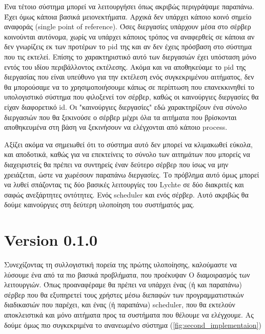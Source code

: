 Ένα τέτοιο σύστημα μπορεί να λειτουργήσει όπως ακριβώς περιγράψαμε παραπάνω. Έχει όμως κάποια βασικά μειονεκτήματα.
Αρχικά δεν υπάρχει κάποιο κοινό σημείο αναφοράς (single point of reference). Όσες διεργασίες υπάρχουν μέσα στο σέρβερ κοινούνται αυτόνομα,
χωρίς να υπάρχει κάποιος τρόπος να αναφερθείς σε κάποια αν δεν γνωρίζεις εκ των προτέρων το pid της και αν δεν έχεις πρόσβαση
στο σύστημα που τις εκτελεί. Επίσης το χαρακτηριστικό αυτό των διεργασιών έχει υπόσταση μόνο εντός του ιδίου περιβάλλοντος εκτέλεσης. Ακόμα και
να αποθηκεύαμε το pid της διεργασίας που είναι υπεύθυνο για την εκτέλεση ενός συγκεκριμένου αιτήματος, δεν θα μπορούσαμε να το χρησιμοποιήσουμε 
κάπως σε περίπτωση που επανεκκινηθεί το υπολογιστικό σύστημα που φιλοξενεί τον σέρβερ, καθώς οι καινούργιες διεργασίες θα είχαν διαφορετικό id.
Οι "καινούργιες διεργασίες" εδώ χαρακτηρίζουν ένα σύνολο διεργασιών που θα ξεκινούσε ο σέρβερ μέχρι όλα τα αιτήματα που βρίσκονται αποθηκευμένα στη βάση
να ξεκινήσουν να ελέγχονται από κάποιο process.

Αξίζει ακόμα να σημειωθεί ότι το σύστημα αυτό δεν μπορεί να κλιμακωθεί εύκολα, και αποδοτικά, καθώς 
για να επεκτείνεις το σύνολο των αιτημάτων που μπορείς να διαχειριστείς θα πρέπει να συντηρείς έναν δεύτερο σέρβερ που ίσως να μην χρειάζεται,
ώστε να χωρέσουν παραπάνω διεργασίες. Το πρόβλημα αυτό όμως μπορεί να λυθεί σπάζοντας τις δύο βασικές λειτουργίες του
Lychte σε δύο διακριτές και σαφώς ανεξάρτητες οντότητες. Ενός scheduler και ενός σέρβερ. Αυτό ακριβώς θα δούμε καινούργιες
στη δεύτερη υλοποίηση του συστήματός μας.

\newpage

\section{Version 0.1.0}
\label{section:second_implementation}

Συνεχίζοντας τη συλλογιστική πορεία της πρώτης υλοποίησης, καλούμαστε να λύσουμε ένα από τα πιο βασικά προβλήματα, που προέκυψαν
Ο διαμοιρασμός των λειτουργιών. Όπως προαναφέραμε θα πρέπει να υπάρχει ένας (ή και παραπάνω) σέρβερ που θα εξυπηρετεί
τους χρήστες μέσω διεπαφών των προγραμματιστικών διαδικασιών που παρέχει, και ένας (ή παραπάνω) scheduler, που θα εκτελούν
αποκλειστικά και μόνο αιτήματα προς τα συστήματα που θέλουμε να ελέγχουμε. Ας δούμε όμως πιο συγκεκριμένα το ανανεωμένο σύστημα (\autoref{fig:second_implementaion})

